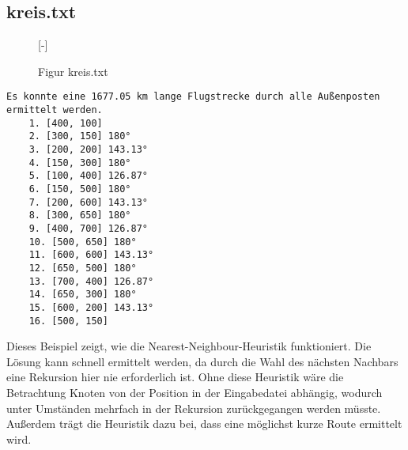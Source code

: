 \documentclass[a4paper,10pt,ngerman]{scrartcl}
\begin{document}
    \subsection{kreis.txt}\label{subsec:kreis.txt}


    \begin{figure}[H]
        [-]
        \FigurFuenf{}
        \caption{Figur kreis.txt}
        \label{fig:Figure2}
    \end{figure}

    \begin{lstlisting}[frame=single, title=Programmausgabe kreis.txt, breaklines=true,label={lst:lstlisting}]
    Es konnte eine 1677.05 km lange Flugstrecke durch alle Außenposten ermittelt werden.
    1. [400, 100]
    2. [300, 150] 180°
    3. [200, 200] 143.13°
    4. [150, 300] 180°
    5. [100, 400] 126.87°
    6. [150, 500] 180°
    7. [200, 600] 143.13°
    8. [300, 650] 180°
    9. [400, 700] 126.87°
    10. [500, 650] 180°
    11. [600, 600] 143.13°
    12. [650, 500] 180°
    13. [700, 400] 126.87°
    14. [650, 300] 180°
    15. [600, 200] 143.13°
    16. [500, 150]
    \end{lstlisting}

    Dieses Beispiel zeigt, wie die Nearest-Neighbour-Heuristik funktioniert.
    Die Lösung kann schnell ermittelt werden, da durch die Wahl des nächsten Nachbars eine Rekursion hier nie erforderlich ist.
    Ohne diese Heuristik wäre die Betrachtung Knoten von der Position in der Eingabedatei abhängig,
    wodurch unter Umständen mehrfach in der Rekursion zurückgegangen werden müsste.
    Außerdem trägt die Heuristik dazu bei, dass eine möglichst kurze Route ermittelt wird.
\end{document}
